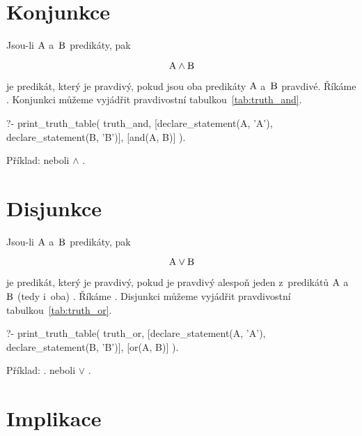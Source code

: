 \section{Konjunkce}

Jsou-li \(\mathrm{A}\) a~\(\mathrm{B}\) predikáty, pak

\begin{equation}
\mathrm{A} \land \mathrm{B} 
\end{equation}

je predikát, který je pravdivý, pokud jsou oba predikáty \(\mathrm{A}\) a~\(\mathrm{B}\) pravdivé. Říkáme .
Konjunkci můžeme vyjádřit pravdivostní tabulkou~\ref{tab:truth_and}.

\begin{prolog}
?- print_truth_table(
	truth_and,
	[declare_statement(A, 'A'), declare_statement(B, 'B')],
	[and(A, B)]
).
\end{prolog}

Příklad:  neboli  \(\land\) .

\section{Disjunkce}

Jsou-li \(\mathrm{A}\) a~\(\mathrm{B}\) predikáty, pak

\begin{equation}
\mathrm{A} \lor \mathrm{B}
\end{equation}

je predikát, který je pravdivý, pokud je pravdivý alespoň jeden z~predikátů \(\mathrm{A}\) a~\(\mathrm{B}\) (tedy i~oba) . Říkáme .
Disjunkci můžeme vyjádřit pravdivostní tabulkou~\ref{tab:truth_or}.

\begin{prolog}
?- print_truth_table(
	truth_or,
	[declare_statement(A, 'A'), declare_statement(B, 'B')],
	[or(A, B)]
).
\end{prolog}

Příklad: . neboli  \(\lor\) .

\section{Implikace}

